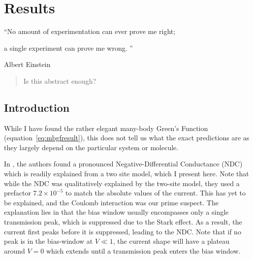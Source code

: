 \chapter{Results}
\label{ch:chapter_4}




\epigraph{
    “No amount of experimentation can ever prove me right;
    
    a single experiment can prove me wrong. ”
}{Albert Einstein}

\begin{abstract}
Is this abstract enough?
\end{abstract}

\newpage
\section{Introduction}
While I have found the rather elegant many-body Green's Function (equation~\ref{eq:mbgfresult}), this does not tell us what the exact predictions are as they largely depend on the particular system or molecule.

In \citet{perrinnano}, the authors found a pronounced Negative-Differential Conductance (NDC) which is readily explained from a two site model, which I present here. Note that while the NDC was qualitatively explained by the two-site model, they used a prefactor $7.2 \times 10^{-5}$ to match the absolute values of the current. This has yet to be explained, and the Coulomb interaction was our prime suspect. The explanation lies in that the bias window usually encompasses only a single transmission peak, which is suppressed due to the Stark effect. As a result, the current first peaks before it is suppressed, leading to the NDC. Note that if no peak is in the bias-window at $V\ll1$, the current shape will have a plateau around $V=0$ which extends until a transmission peak enters the bias window. 

